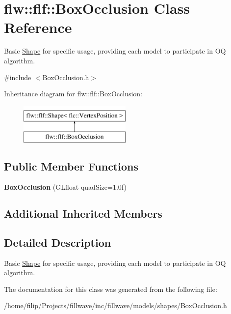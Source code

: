 \hypertarget{classflw_1_1flf_1_1BoxOcclusion}{}\section{flw\+:\+:flf\+:\+:Box\+Occlusion Class Reference}
\label{classflw_1_1flf_1_1BoxOcclusion}


Basic \hyperlink{classflw_1_1flf_1_1Shape}{Shape} for specific usage, providing each model to participate in OQ algorithm.  




{\ttfamily \#include $<$Box\+Occlusion.\+h$>$}

Inheritance diagram for flw\+:\+:flf\+:\+:Box\+Occlusion\+:\begin{figure}[H]
\begin{center}
\leavevmode
\includegraphics[height=2.000000cm]{classflw_1_1flf_1_1BoxOcclusion}
\end{center}
\end{figure}
\subsection*{Public Member Functions}
\begin{DoxyCompactItemize}
\item 
{\bfseries Box\+Occlusion} (G\+Lfloat quad\+Size=1.\+0f)\hypertarget{classflw_1_1flf_1_1BoxOcclusion_a8c6897ee2fc8384490f2a78714004ff9}{}\label{classflw_1_1flf_1_1BoxOcclusion_a8c6897ee2fc8384490f2a78714004ff9}

\end{DoxyCompactItemize}
\subsection*{Additional Inherited Members}


\subsection{Detailed Description}
Basic \hyperlink{classflw_1_1flf_1_1Shape}{Shape} for specific usage, providing each model to participate in OQ algorithm. 

The documentation for this class was generated from the following file\+:\begin{DoxyCompactItemize}
\item 
/home/filip/\+Projects/fillwave/inc/fillwave/models/shapes/Box\+Occlusion.\+h\end{DoxyCompactItemize}
